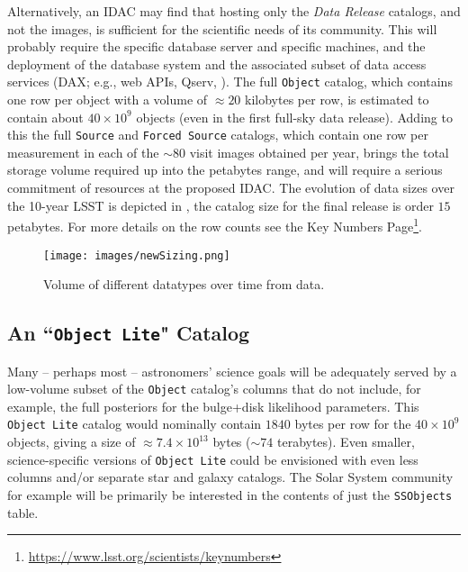 Alternatively, an \gls{IDAC} may find that hosting only the {\it Data Release} catalogs, and not the images, is sufficient for the scientific needs of its community. This will probably require the specific \RO database server  and specific machines, and the deployment of the database system and the associated subset of data access services (\gls{DAX}; e.g., web APIs, \gls{Qserv}, ). The full {\tt Object} catalog, which contains one row per object with a volume of $\approx 20$ kilobytes per row, is estimated to contain about $40 \times 10^9$ objects (even in the first full-sky data release). Adding to this the full {\tt Source} and {\tt Forced Source} catalogs, which contain one row per measurement in each of the $\sim80$ visit images obtained per year, brings the total storage volume required up into the petabytes range, and will require a serious commitment of resources at the proposed \gls{IDAC}. The evolution of data sizes over the 10-year \gls{LSST} is depicted in , the catalog size for the final release is order $15$ petabytes. For more details on the row counts see the Key Numbers Page\footnote{\url{https://www.lsst.org/scientists/keynumbers}}.

\begin{figure}
\begin{center}
\texttt{[image: images/newSizing.png]}
\caption{ Volume of different datatypes  over time from  data. \label{fig:catvol}}
\end{center}
\end{figure}

\subsection{An ``{\tt \gls{Object} Lite}" Catalog}\label{sec:lite}

Many -- perhaps most -- astronomers' science goals will be adequately served by a low-volume subset of the {\tt \gls{Object}} catalog's columns that do not include, for example, the full posteriors for the bulge+disk likelihood parameters.
This {\tt \gls{Object} Lite} catalog would nominally contain $1840$ bytes per row for the $40 \times 10^{9}$ objects, giving a size of $\approx 7.4 \times 10^{13}$ bytes ($\sim74$ terabytes).
Even smaller, science-specific versions of {\tt \gls{Object} Lite} could be envisioned with even less columns and/or separate star and galaxy catalogs.
The Solar System community for example will be primarily be interested in the contents of  just the  {\tt SSObjects} table.

